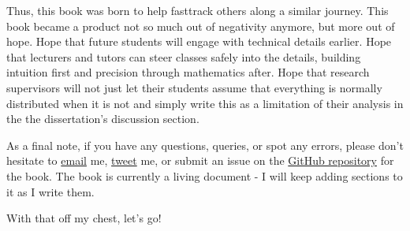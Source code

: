 \documentclass[
]{book}
\begin{document}
Thus, this book was born to help fasttrack others along a similar journey. This book became a product not so much out of negativity anymore, but more out of hope. Hope that future students will engage with technical details earlier. Hope that lecturers and tutors can steer classes safely into the details, building intuition first and precision through mathematics after. Hope that research supervisors will not just let their students assume that everything is normally distributed when it is not and simply write this as a limitation of their analysis in the the dissertation's discussion section.

As a final note, if you have any questions, queries, or spot any errors, please don't hesitate to \href{trent.henderson1@outlook.com}{email} me, \href{https://twitter.com/trentlikesstats}{tweet} me, or submit an issue on the \href{https://github.com/hendersontrent/bayes-for-consulting}{GitHub repository} for the book. The book is currently a living document - I will keep adding sections to it as I write them.

With that off my chest, let's go!
\end{document}
